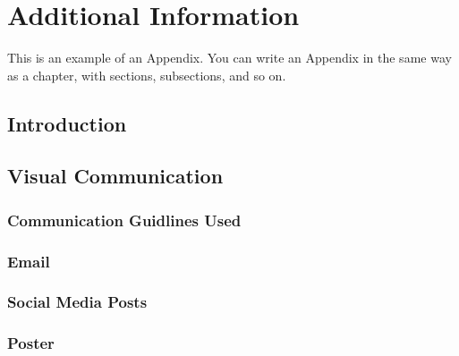 
\chapter{Additional Information}
This is an example of an Appendix. You can write an Appendix in the same way as a chapter, with sections, subsections, and so on.

\section{Introduction}

\section{Visual Communication}

\subsection{Communication Guidlines Used}

\subsection{Email}

\subsection{Social Media Posts}

\subsection{Poster}

